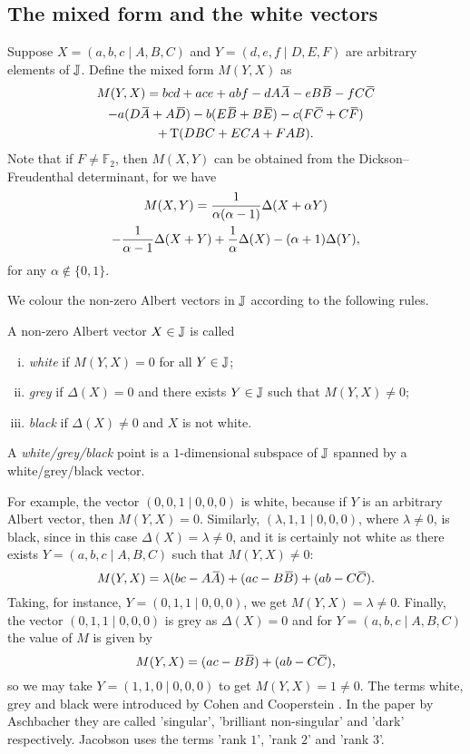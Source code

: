\subsection{The mixed form and the white vectors}
Suppose $X = (a,b,c \mid A,B,C)$ and $Y = (d,e,f\mid D,E,F)$ are arbitrary elements
of $\mathbb{J}$. Define the mixed form
$M(Y,X)$ as
\begin{multline}
	M(Y,X) = bcd + ace + abf - d A\ovA  -e B \ovB - f C\ovC \\
	- a(D\ovA + A\ovD) - b(E\ovB + B\ovE) - c(F\ovC + C\ovF) \\
	+ \Tr(DBC + ECA + FAB). 
\end{multline}
Note that if $F \neq \mathbb{F}_2$, then $M(X,Y)$ can be obtained from the 
Dickson--Freudenthal
determinant, for we have
\begin{multline}
	M(X,Y) = \frac{1}{\alpha (\alpha - 1)} \Delta(X + \alpha Y) \\
	- \frac{1}{\alpha - 1} \Delta(X+Y) + \frac{1}{\alpha} \Delta(X) - (\alpha+1)\Delta(Y),
\end{multline}
for any $\alpha \not\in \{0,1\}$.

We colour the non-zero Albert vectors in $\mathbb{J}$ according to the following rules. 
\begin{definition}
	A non-zero Albert vector $X \in \mathbb{J}$ is called
	\begin{enumerate}[(i)]
		\item \textit{white} if $M(Y,X) = 0$ for all $Y \in \mathbb{J}$;
		\item \textit{grey} if $\Delta(X) = 0$ and there exists $Y \in \mathbb{J}$ such that 
			$M(Y,X) \neq 0$;
		\item \textit{black} if $\Delta(X) \neq 0$ and $X$ is not white.  
	\end{enumerate}
	A \textit{white/grey/black} point is a $1$-dimensional subspace of $\mathbb{J}$ spanned by a 
	white/grey/black vector. 
\end{definition}

For example, the vector $(0,0,1\mid 0,0,0)$ is white, because if $Y$
is an arbitrary Albert vector, then $M(Y,X) = 0$. Similarly, $(\lambda,1,1\mid 0,0,0)$,
where $\lambda \neq 0$, is black, since in this case $\Delta(X) = \lambda \neq 0$,
and it is certainly not white as there exists $Y = (a,b,c\mid A,B,C)$ such that 
$M(Y,X)\neq 0$:
\begin{equation}
	M(Y,X) = \lambda (bc - A\ovA) + (ac - B\ovB) + (ab - C\ovC). 
\end{equation}
Taking, for instance, $Y = (0,1,1\mid 0,0,0)$, we get $M(Y,X) = \lambda \neq 0$. Finally, the
vector
\mbox{$(0,1,1\mid 0,0,0)$} is grey as $\Delta(X) = 0$ and for $Y = (a,b,c\mid A,B,C)$ the
value of $M$ is given by
\begin{equation}
	M(Y,X) = (ac - B\ovB) + (ab - C\ovC),
\end{equation}
so we may take $Y = (1,1,0\mid 0,0,0)$ to get $M(Y,X) = 1 \neq 0$. 
The terms white, grey and black were introduced by Cohen and Cooperstein 
\cite{CC}. In the paper by Aschbacher \cite{Asch1} they are called
'singular', 'brilliant non-singular' and 'dark' respectively. 
Jacobson \cite{JacobsonTwo} uses the terms 'rank $1$', 'rank $2$' and 'rank $3$'. 

